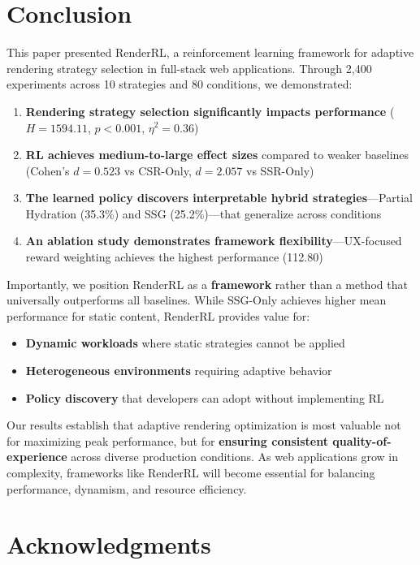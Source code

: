 \documentclass[10pt,twocolumn]{article}
\newcommand{\method}{RenderRL}
\begin{document}
\section{Conclusion}
\label{sec:conclusion}

This paper presented \method{}, a reinforcement learning framework for adaptive rendering strategy selection in full-stack web applications. Through 2,400 experiments across 10 strategies and 80 conditions, we demonstrated:

\begin{enumerate}[nosep]
\item \textbf{Rendering strategy selection significantly impacts performance} ($H = 1594.11$, $p < 0.001$, $\eta^2 = 0.36$)
\item \textbf{RL achieves medium-to-large effect sizes} compared to weaker baselines (Cohen's $d = 0.523$ vs CSR-Only, $d = 2.057$ vs SSR-Only)
\item \textbf{The learned policy discovers interpretable hybrid strategies}---Partial Hydration (35.3\%) and SSG (25.2\%)---that generalize across conditions
\item \textbf{An ablation study demonstrates framework flexibility}---UX-focused reward weighting achieves the highest performance (112.80)
\end{enumerate}

Importantly, we position \method{} as a \textbf{framework} rather than a method that universally outperforms all baselines. While SSG-Only achieves higher mean performance for static content, \method{} provides value for:

\begin{itemize}[nosep]
\item \textbf{Dynamic workloads} where static strategies cannot be applied
\item \textbf{Heterogeneous environments} requiring adaptive behavior
\item \textbf{Policy discovery} that developers can adopt without implementing RL
\end{itemize}

Our results establish that adaptive rendering optimization is most valuable not for maximizing peak performance, but for \textbf{ensuring consistent quality-of-experience} across diverse production conditions. As web applications grow in complexity, frameworks like \method{} will become essential for balancing performance, dynamism, and resource efficiency.

\section*{Acknowledgments}
\end{document}
